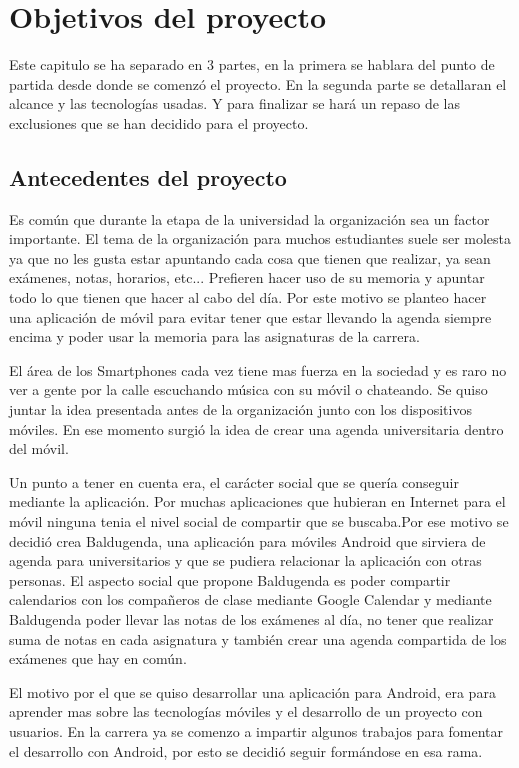 \chapter{Objetivos del proyecto}
Este capitulo se ha separado en 3 partes, en la primera se hablara del punto de partida desde donde se comenzó el proyecto. En la segunda parte se detallaran el alcance y las tecnologías usadas. Y para finalizar se hará un repaso de las exclusiones que se han decidido para el proyecto.
\section{Antecedentes del proyecto}
\label{secc:Antecedentes}
Es común que durante la etapa de la universidad la organización sea un factor importante. El tema de la organización para muchos estudiantes suele ser molesta ya que no les gusta estar apuntando cada cosa que tienen que realizar, ya sean exámenes, notas, horarios, etc... Prefieren hacer uso de su memoria y apuntar todo lo que tienen que hacer al cabo del día. Por este motivo se planteo hacer una aplicación de móvil para evitar tener que estar llevando la agenda siempre encima y poder usar la memoria para las asignaturas de la carrera.

El área de los Smartphones cada vez tiene mas fuerza en la sociedad y es raro no ver a gente por la calle escuchando música con su móvil o chateando. Se quiso juntar la idea presentada antes de la organización junto con los dispositivos móviles. En ese momento surgió la idea de crear una agenda universitaria dentro del móvil. 

Un punto a tener en cuenta era, el carácter social que se quería conseguir  mediante la aplicación. Por muchas aplicaciones que hubieran en Internet para el móvil ninguna tenia el nivel social de compartir que se buscaba.Por ese motivo se decidió crea Baldugenda, una aplicación para móviles Android que sirviera de agenda para universitarios y que se pudiera relacionar la aplicación con otras personas.
El aspecto social que propone Baldugenda es poder compartir calendarios con los compañeros de clase mediante Google Calendar y mediante Baldugenda poder llevar las notas de los exámenes al día, no tener que realizar suma de notas en cada asignatura y también crear una agenda compartida de los exámenes que hay en común.

El motivo por el que se quiso desarrollar una aplicación para Android, era para aprender mas sobre las tecnologías móviles y el desarrollo de un proyecto con usuarios. En la carrera ya se comenzo a impartir algunos trabajos para fomentar el desarrollo con Android, por esto se decidió seguir formándose en esa rama.
 
